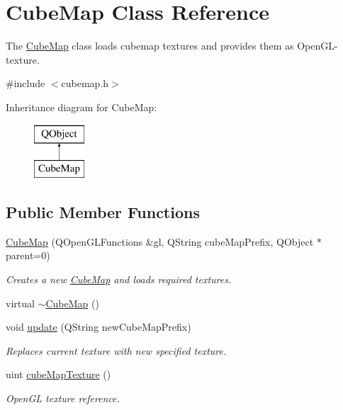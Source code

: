 \hypertarget{class_cube_map}{\section{Cube\+Map Class Reference}
\label{class_cube_map}
}


The \hyperlink{class_cube_map}{Cube\+Map} class loads cubemap textures and provides them as Open\+G\+L-\/texture.  




{\ttfamily \#include $<$cubemap.\+h$>$}

Inheritance diagram for Cube\+Map\+:\begin{figure}[H]
\begin{center}
\leavevmode
\includegraphics[height=2.000000cm]{class_cube_map}
\end{center}
\end{figure}
\subsection*{Public Member Functions}
\begin{DoxyCompactItemize}
\item 
\hyperlink{class_cube_map_ac1b76abb3b551a933b23f31038855699}{Cube\+Map} (Q\+Open\+G\+L\+Functions \&gl, Q\+String cube\+Map\+Prefix, Q\+Object $\ast$parent=0)
\begin{DoxyCompactList}\small\item\em Creates a new \hyperlink{class_cube_map}{Cube\+Map} and loads required textures. \end{DoxyCompactList}\item 
virtual \hyperlink{class_cube_map_ac4c453248cd7022d3b268755b2dd218e}{$\sim$\+Cube\+Map} ()
\item 
void \hyperlink{class_cube_map_a5d772f8a6b43356593dc909a704354eb}{update} (Q\+String new\+Cube\+Map\+Prefix)
\begin{DoxyCompactList}\small\item\em Replaces current texture with new specified texture. \end{DoxyCompactList}\item 
uint \hyperlink{class_cube_map_a23189c7b896857a6080d1ceb1abf8e4a}{cube\+Map\+Texture} ()
\begin{DoxyCompactList}\small\item\em Open\+G\+L texture reference. \end{DoxyCompactList}\end{DoxyCompactItemize}
